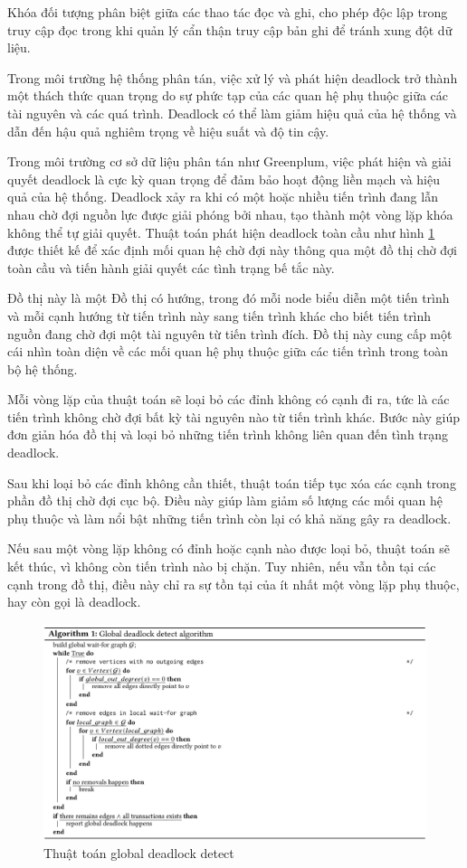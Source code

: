 \documentclass{article}[14pt]
\begin{document}
Khóa đối tượng phân biệt giữa các thao tác đọc và ghi, cho phép độc lập trong truy cập đọc trong khi quản lý cẩn thận truy cập bản ghi để tránh xung đột dữ liệu.

Trong môi trường hệ thống phân tán, việc xử lý và phát hiện deadlock trở thành một thách thức quan trọng do sự phức tạp của các quan hệ phụ thuộc giữa các tài nguyên và các quá trình. Deadlock có thể làm giảm hiệu quả của hệ thống và dẫn đến hậu quả nghiêm trọng về hiệu suất và độ tin cậy.



Trong môi trường cơ sở dữ liệu phân tán như Greenplum, việc phát hiện và giải quyết deadlock là cực kỳ quan trọng để đảm bảo hoạt động liền mạch và hiệu quả của hệ thống. Deadlock xảy ra khi có một hoặc nhiều tiến trình đang lẫn nhau chờ đợi nguồn lực được giải phóng bởi nhau, tạo thành một vòng lặp khóa không thể tự giải quyết. Thuật toán phát hiện deadlock toàn cầu như hình \ref{fig:algorithmGreenplum}  được thiết kế để xác định mối quan hệ chờ đợi này thông qua một đồ thị chờ đợi toàn cầu và tiến hành giải quyết các tình trạng bế tắc này.

Đồ thị này là một Đồ thị có hướng, trong đó mỗi node biểu diễn một tiến trình và mỗi cạnh hướng từ tiến trình này sang tiến trình khác cho biết tiến trình nguồn đang chờ đợi một tài nguyên từ tiến trình đích. Đồ thị này cung cấp một cái nhìn toàn diện về các mối quan hệ phụ thuộc giữa các tiến trình trong toàn bộ hệ thống.

Mỗi vòng lặp của thuật toán sẽ loại bỏ các đỉnh không có cạnh đi ra, tức là các tiến trình không chờ đợi bất kỳ tài nguyên nào từ tiến trình khác. Bước này giúp đơn giản hóa đồ thị và loại bỏ những tiến trình không liên quan đến tình trạng deadlock.

Sau khi loại bỏ các đỉnh không cần thiết, thuật toán tiếp tục xóa các cạnh trong phần đồ thị chờ đợi cục bộ. Điều này giúp làm giảm số lượng các mối quan hệ phụ thuộc và làm nổi bật những tiến trình còn lại có khả năng gây ra deadlock.

Nếu sau một vòng lặp không có đỉnh hoặc cạnh nào được loại bỏ, thuật toán sẽ kết thúc, vì không còn tiến trình nào bị chặn. Tuy nhiên, nếu vẫn tồn tại các cạnh trong đồ thị, điều này chỉ ra sự tồn tại của ít nhất một vòng lặp phụ thuộc, hay còn gọi là deadlock.



\begin{figure}
    \centering
    \includegraphics[width=0.8\linewidth]{images/algorithmGreenplum.png}
    \caption{Thuật toán global deadlock detect \cite{lyu2021greenplum}}
    \label{fig:algorithmGreenplum}
\end{figure}
\end{document}
